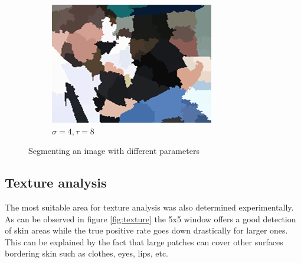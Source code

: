\documentclass[12pt]{report}
\begin{document}
\begin{figure}[h!]
\begin{subfigure}[b]{0.3\linewidth}
			\includegraphics[width=\linewidth]{resources/segm_4_8.png}
			\caption{$\sigma = 4, \tau = 8$}
		\end{subfigure}
		\caption{Segmenting an image with different parameters}
		\label{fig:segmentation}
	\end{figure}
	
	\subsection{Texture analysis}
	The most suitable area for texture analysis was also determined experimentally. As can be observed in figure \ref{fig:texture} the 5x5 window offers a good detection of skin areas while the true positive rate goes down drastically for larger ones. This can be explained by the fact that large patches can cover other surfaces bordering skin such as clothes, eyes, lips, etc.
	
\end{document}
